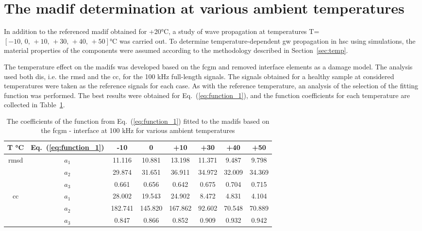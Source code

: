 \section{The \acl{madif} determination at various ambient temperatures}
\label{sec:madifTemp}

In addition to the referenced \ac{madif} obtained for +20\unit{\degreeCelsius}, a study of wave propagation at temperatures T=\(\left[-10,\,0,\,+10,\,+30,\,+40,\,+50\right]\)\unit{\degreeCelsius} was carried out.
To determine temperature-dependent \ac{gw} propagation in \ac{hsc} using simulations, the material properties of the components were assumed according to the methodology described in Section~\ref{sec:temp}.

The temperature effect on the \acp{madif} was developed based on the \ac{fcgm} and removed interface elements as a damage model.
The analysis used both \acp{di}, i.e. the \ac{rmsd} and the \ac{cc}, for the 100 \unit{\kHz} full-length signals.
The signals obtained for a healthy sample at considered temperatures were taken as the reference signals for each case.
As with the reference temperature, an analysis of the selection of the fitting function was performed.
The best results were obtained for Eq.~(\ref{eq:function_1}), and the function coefficients for each temperature are collected in Table~\ref{tab:fit_F_err_temp}.
\begin{table}[!tbh]
	\small
	\tabcolsep=0.25cm
	\centering
	\caption{\label{tab:fit_F_err_temp} The coefficients of the function from Eq.~(\ref{eq:function_1}) fitted to the \aclp{madif} based on the \acl{fcgm} - interface at 100 \unit{\kHz} for various ambient temperatures}
	\begin{tabular}{cccccccc}
		\toprule
		{T \unit{\degreeCelsius}} & Eq.~(\ref{eq:function_1}) & -10 & 0 & +10 & +30 & +40 & +50\\
		\midrule
		\multirow{3}{*}{\ac{rmsd}} & $a_1$ & 11.116 & 10.881 & 13.198 & 11.371 & 9.487 & 9.798\\
		 & $a_2$ & 29.874 & 31.651 & 36.911 & 34.972 & 32.009 & 34.369\\
		 & $a_3$ & 0.661 & 0.656 & 0.642 & 0.675 & 0.704 & 0.715\\
		\midrule
		\multirow{3}{*}{\ac{cc}} & $a_1$ & 28.002 & 19.543 & 24.902 & 8.472 & 4.831 & 4.104\\
		& $a_2$ & 182.741 & 145.820 & 167.862 & 92.602 & 70.548 & 70.889\\
		& $a_3$ & 0.847 & 0.866 & 0.852 & 0.909 & 0.932 & 0.942\\
		\bottomrule
	\end{tabular}
\end{table}

